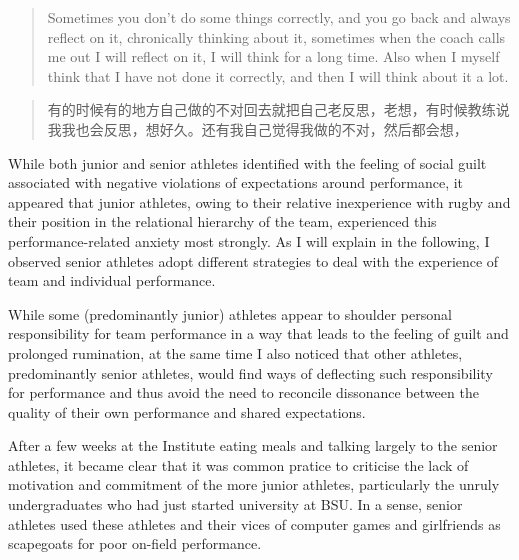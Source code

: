 \begin{CJK}{UTF8}{gbsn}
      \begin{quotation}
        Sometimes you don't do some things correctly, and you go back and always reflect on it, chronically thinking about it, sometimes when the coach calls me out I will reflect on it, I will think for a long time. Also when I myself think that I have not done it correctly, and then I will think about it a lot.
      \end{quotation}

      \begin{quotation}
        有的时候有的地方自己做的不对回去就把自己老反思，老想，有时候教练说我我也会反思，想好久。还有我自己觉得我做的不对，然后都会想，
      \end{quotation}


While both junior and senior athletes identified with the feeling of social guilt associated with negative violations of expectations around performance, it appeared that junior athletes, owing to their relative inexperience with rugby and their position in the relational hierarchy of the team, experienced this performance-related anxiety most strongly.  As I will explain in the following, I observed senior athletes adopt different strategies to deal with the experience of team and individual performance.


While some (predominantly junior) athletes appear to shoulder personal responsibility for team performance in a way that leads to the feeling of guilt and prolonged rumination, at the same time I also noticed that other athletes, predominantly senior athletes, would find ways of deflecting such responsibility for performance and thus avoid the need to reconcile dissonance between the quality of their own performance and shared expectations.

After a few weeks at the Institute eating meals and talking largely to the senior athletes, it became clear that it was common pratice to criticise the lack of motivation and commitment of the more junior athletes, particularly the unruly undergraduates who had just started university at BSU.  In a sense, senior athletes used these athletes and their vices of computer games and girlfriends as scapegoats for poor on-field performance.


\end{CJK}
